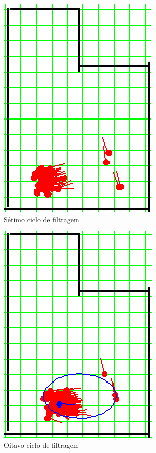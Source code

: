 \begin{figure}[H]
  \centering
  \includegraphics[scale=0.6]{figuras/cen1_ex1/8.eps}
  \caption[Sétimo Ciclo de Filtragem]{Sétimo ciclo de filtragem}
  \label{img:cen1_ex1_8}
\end{figure}

\begin{figure}[H]
  \centering
  \includegraphics[scale=0.6]{figuras/cen1_ex1/9.eps}
  \caption[Oitavo Ciclo de Filtragem]{Oitavo ciclo de filtragem}
  \label{img:cen1_ex1_9}
\end{figure}

